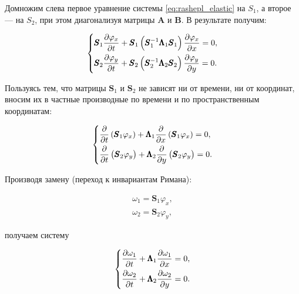 \noindent Домножим слева первое уравнение системы \eqref{eq:rashepl_elastic} на $S_1$, а второе --- на $S_2$, при этом диагонализуя матрицы $\pmb{A}$ и $\pmb{B}$. В результате получим:

\begin{equation*}
\begin{dcases}
    \pmb{S}_1  \dfrac{\partial \varphi_x}{\partial t} +
    \pmb{S}_1 \left(\pmb{S}^{-1}_1 \pmb{\Lambda}_1 \pmb{S}_1 \right) \dfrac{\partial \varphi_x}{\partial x} = 0 , \\
    \pmb{S}_2 \dfrac{\partial \varphi_y}{\partial t} + 
    \pmb{S}_2  \left(\pmb{S}^{-1}_2 \pmb{\Lambda}_2 \pmb{S}_2\right) \dfrac{\partial \varphi_y}{\partial y} = 0 .
\end{dcases}
\end{equation*}

\noindent Пользуясь тем, что матрицы $\pmb{S}_1$ и $\pmb{S}_2$ не зависят ни от времени, ни от координат, вносим их в частные производные по времени и по пространственным координатам:

\begin{equation*}
\begin{dcases}
    \dfrac{\partial}{\partial t} \left(\pmb{S}_1 \varphi_x\right) +
    \pmb{\Lambda}_1 \dfrac{\partial}{\partial x} \left(\pmb{S}_1 \varphi_x\right) = 0 , \\
    \dfrac{\partial}{\partial t} \left(\pmb{S}_2 \varphi_y\right) + 
    \pmb{\Lambda}_2 \dfrac{\partial}{\partial y} \left(\pmb{S}_2 \varphi_y\right) = 0 .
\end{dcases}
\end{equation*}

\noindent Производя замену (переход к инвариантам Римана):

\begin{equation}
\begin{matrix}
    \omega_1 = \pmb{S}_1 \varphi_x , \\
    \omega_2 = \pmb{S}_2 \varphi_y ,
\end{matrix}
\label{eq:riman_variable}
\end{equation}

\noindent получаем систему

\begin{equation}
\begin{dcases}
    \dfrac{\partial \omega_1}{\partial t}  +
    \pmb{\Lambda}_1 \dfrac{\partial \omega_1}{\partial x} = 0 , \\
    \dfrac{\partial \omega_2}{\partial t} + 
    \pmb{\Lambda}_2 \dfrac{\partial \omega_2}{\partial y} = 0 .
\end{dcases}
\label{eq:grid_char_res}
\end{equation}

